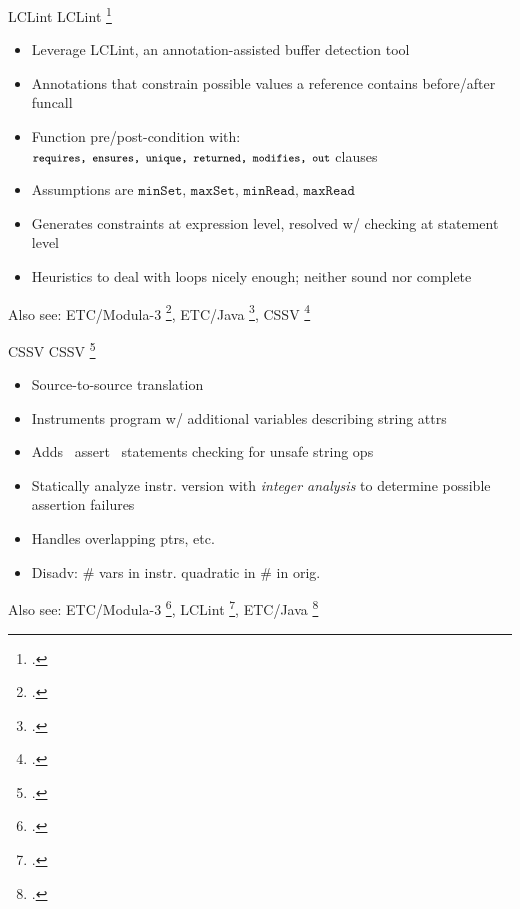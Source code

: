 \documentclass[aspectratio=169]{beamer}
\begin{document}
\begin{frame}[fragile]{LCLint}
LCLint \footcite{larochelle_statically_2001}
\begin{itemize}
    \item Leverage LCLint, an annotation-assisted buffer detection tool
    \item Annotations that constrain possible values a reference contains before/after funcall
    \item Function pre/post-condition with: $\footnotesize{\texttt{requires, ensures, unique, returned, modifies, out}}$ clauses
    \item Assumptions are $\texttt{minSet, maxSet, minRead, maxRead}$ %
    \item Generates constraints at expression level, resolved w/ checking at statement level
    \item Heuristics to deal with loops nicely enough; neither sound nor complete
\end{itemize}
    Also see: ETC/Modula-3 \footcite{detlefs_overview_1995}, ETC/Java \footcite{flanagan_extended_2002}, CSSV \footcite{dor_cssv:_2003}
    \vspace{0.2in}
\end{frame}

\begin{frame}[fragile]{CSSV}
CSSV \footcite{dor_cssv:_2003}
\begin{itemize}
    \item Source-to-source translation
    \item Instruments program w/ additional variables describing string attrs
    \item Adds ~assert~ statements checking for unsafe string ops
    \item Statically analyze instr. version with \emph{integer analysis} to determine possible assertion failures
    \item Handles overlapping ptrs, etc.
    \item Disadv: \# vars in instr. quadratic in \# in orig.
\end{itemize}
    Also see: ETC/Modula-3 \footcite{detlefs_overview_1995}, LCLint \footcite{larochelle_statically_2001}, ETC/Java \footcite{flanagan_extended_2002}
    \vspace{0.2in}
\end{frame}
\end{document}
